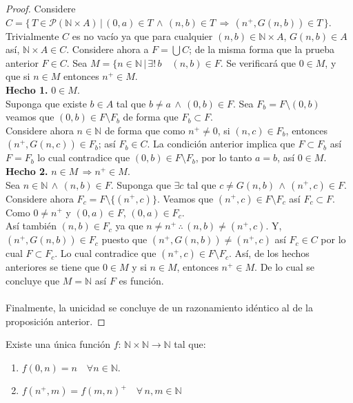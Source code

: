     \begin{proof}
        Considere $C=\{\,T \in \mathcal{P}(\mathbb{N} \times A) \, | \, (0,a) \in
        T \, \land \, (n,b) \in T \, \Rightarrow \, (n^+, G(n,b)) \in T\,\}$.
        Trivialmente $C$ es no vacío ya que para cualquier $(n,b)\in
        \mathbb{N}\times A$,  $G(n, b) \in A$ así, $\mathbb{N}
        \times A \in C$. Considere ahora a $F = \bigcup C$; de la misma forma
        que la prueba anterior $F \in C$.
        Sea $M = \{n \in \mathbb{N} \, | \, \exists! \, b \quad (n,b) \in F$. Se
        verificará que $0 \in M$, y que si $n \in M$ entonces $n^+ \in M$.\\
        \textbf{Hecho 1.} $0 \in M$. \\
        Suponga que existe $b \in A$ tal que $b \neq a \, \land \, (0,b) \in
        F$. Sea $F_b = F \setminus {(0,b)}$ veamos que $(0,b) \in F \setminus
        F_b$ de forma que $F_b \subset F$. \\
        Considere ahora $n \in \mathbb{N}$ de forma que como $n^+ \neq 0$,
        si $(n, c)\in F_b$, entonces $(n^+,G(n,c))\in F_b$; así $F_b \in C$. 
        La condición anterior implica
        que $F \subset F_b$ así $F=F_b$ lo cual contradice que $(0,b) \in F
        \setminus F_b$, por lo tanto $a=b$, así $0 \in M$. \\
        \textbf{Hecho 2.} $n \in M \, \Rightarrow n^+ \in M$.\\
        Sea $n \in \mathbb{N} \, \land \, (n, b)\in F$. Suponga que $\exists c$
        tal que $c \neq G(n, b) \, 
        \land \, (n^+, c) \in F$. Considere ahora $F_c = F \setminus \{(n^+,
        c)\}$. Veamos que $(n^+, c) \in F \setminus F_c$ así $F_c \subset F$.
        Como $0 \neq n^+$ y $(0,a) \in F$, $(0,a) \in F_c$. \\
        Así también $(n,b) \in F_c$ ya que $n \neq n^+ \,\therefore \,
        (n,b)\neq(n^+,c)$. Y, $(n^+, G(n,b)) \in F_c$ puesto que $(n^+,
        G(n,b))\neq (n^+, c)$ así $F_c \in C$ por lo cual $F \subset F_c$. Lo
        cual contradice que $(n^+, c) \in F \setminus F_c$. Así, de los hechos
        anteriores se tiene que $0 \in M$ y si $n \in M$, entonces $n^+ \in M$.
        De lo cual se concluye que $M= \mathbb{N}$ así $F$ es función.\\ \\
        Finalmente, la unicidad se concluye de un razonamiento idéntico al de la
        proposición anterior.

    \end{proof}
    \lineskip
    \begin{proposition} Existe una única función $f: \, \mathbb{N} \times
        \mathbb{N} \rightarrow \mathbb{N}$ tal que:
        \begin{enumerate}
            \item $f(0,n) = n \quad \forall n \in \mathbb{N}$.
            \item $f(n^+,m) = f(m,n)^+ \quad \forall \, n, m \in \mathbb{N} $
        \end{enumerate}
    \end{proposition}
